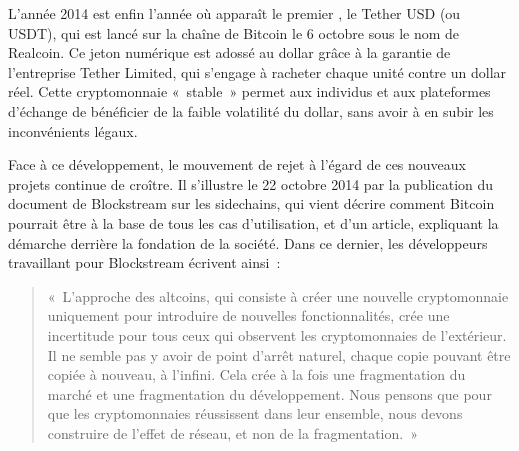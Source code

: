 L'année 2014 est enfin l'année où apparaît le premier , le Tether USD (ou USDT), qui est lancé sur la chaîne de Bitcoin le 6 octobre sous le nom de Realcoin. Ce jeton numérique est adossé au dollar grâce à la garantie de l'entreprise Tether Limited, qui s'engage à racheter chaque unité contre un dollar réel. Cette cryptomonnaie «~stable~» permet aux individus et aux plateformes d'échange de bénéficier de la faible volatilité du dollar, sans avoir à en subir les inconvénients légaux.

Face à ce développement, le mouvement de rejet à l'égard de ces nouveaux projets continue de croître. Il s'illustre le 22 octobre 2014 par la publication du document de Blockstream sur les sidechains, qui vient décrire comment Bitcoin pourrait être à la base de tous les cas d'utilisation, et d'un article, expliquant la démarche derrière la fondation de la société. Dans ce dernier, les développeurs travaillant pour Blockstream écrivent ainsi~:

\begin{quote}
«~L'approche des altcoins, qui consiste à créer une nouvelle cryptomonnaie uniquement pour introduire de nouvelles fonctionnalités, crée une incertitude pour tous ceux qui observent les cryptomonnaies de l'extérieur. Il ne semble pas y avoir de point d'arrêt naturel, chaque copie pouvant être copiée à nouveau, à l'infini. Cela crée à la fois une fragmentation du marché et une fragmentation du développement. Nous pensons que pour que les cryptomonnaies réussissent dans leur ensemble, nous devons construire de l'effet de réseau, et non de la fragmentation.~»
\end{quote}

